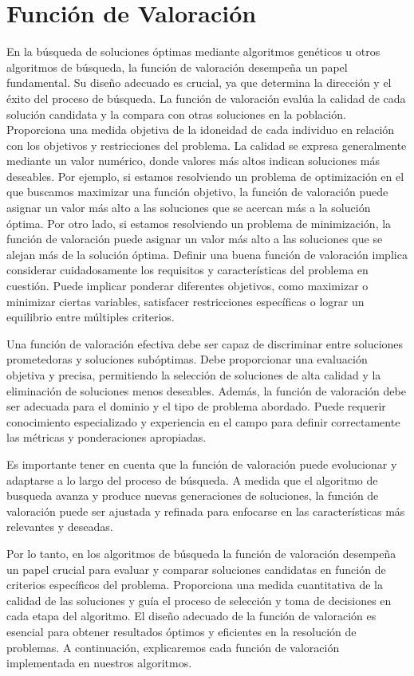 \section{Función de Valoración}
\label{sec:fitness}


En la búsqueda de soluciones óptimas mediante algoritmos genéticos u otros algoritmos de búsqueda, la función de valoración \cite{goldberg1989genetic} desempeña un papel fundamental. Su diseño adecuado es crucial, ya que determina la dirección y el éxito del proceso de búsqueda.
La función de valoración evalúa la calidad de cada solución candidata y la compara con otras soluciones en la población. Proporciona una medida objetiva de la idoneidad de cada individuo en relación con los objetivos y restricciones del problema. La calidad se expresa generalmente mediante un valor numérico, donde valores más altos indican soluciones más deseables. Por ejemplo, si estamos resolviendo un problema de optimización en el que buscamos maximizar una función objetivo, la función de valoración puede asignar un valor más alto a las soluciones que se acercan más a la solución óptima. Por otro lado, si estamos resolviendo un problema de minimización, la función de valoración puede asignar un valor más alto a las soluciones que se alejan más de la solución óptima.
Definir una buena función de valoración implica considerar cuidadosamente los requisitos y características del problema en cuestión. Puede implicar ponderar diferentes objetivos, como maximizar o minimizar ciertas variables, satisfacer restricciones específicas o lograr un equilibrio entre múltiples criterios. 

Una función de valoración efectiva debe ser capaz de discriminar entre soluciones prometedoras y soluciones subóptimas. Debe proporcionar una evaluación objetiva y precisa, permitiendo la selección de soluciones de alta calidad y la eliminación de soluciones menos deseables.
Además, la función de valoración debe ser adecuada para el dominio y el tipo de problema abordado. Puede requerir conocimiento especializado y experiencia en el campo para definir correctamente las métricas y ponderaciones apropiadas. 

Es importante tener en cuenta que la función de valoración puede evolucionar y adaptarse a lo largo del proceso de búsqueda. A medida que el algoritmo de busqueda avanza y produce nuevas generaciones de soluciones, la función de valoración puede ser ajustada y refinada para enfocarse en las características más relevantes y deseadas.


Por lo tanto, en los algoritmos de búsqueda la función de valoración desempeña un papel crucial para evaluar y comparar soluciones candidatas en función de criterios específicos del problema. Proporciona una medida cuantitativa de la calidad de las soluciones y guía el proceso de selección y toma de decisiones en cada etapa del algoritmo. El diseño adecuado de la función de valoración es esencial para obtener resultados óptimos y eficientes en la resolución de problemas.
A continuación, explicaremos cada función de valoración implementada en nuestros algoritmos.


